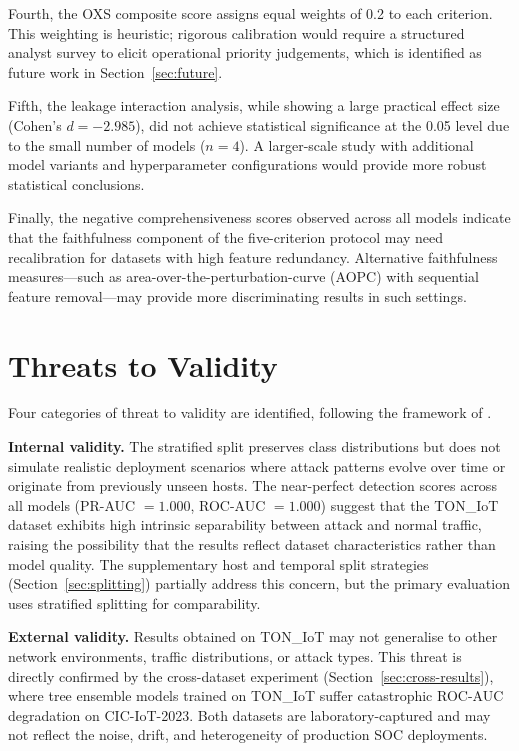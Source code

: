 \documentclass[12pt,a4paper]{report}
\begin{document}
Fourth, the OXS composite score assigns equal weights of 0.2 to each criterion. This weighting is heuristic; rigorous calibration would require a structured analyst survey to elicit operational priority judgements, which is identified as future work in Section~\ref{sec:future}.

Fifth, the leakage interaction analysis, while showing a large practical effect size (Cohen's $d = -2.985$), did not achieve statistical significance at the 0.05 level due to the small number of models ($n = 4$). A larger-scale study with additional model variants and hyperparameter configurations would provide more robust statistical conclusions.

Finally, the negative comprehensiveness scores observed across all models indicate that the faithfulness component of the five-criterion protocol may need recalibration for datasets with high feature redundancy. Alternative faithfulness measures---such as area-over-the-perturbation-curve (AOPC) with sequential feature removal---may provide more discriminating results in such settings.

\section{Threats to Validity}
\label{sec:threats}

Four categories of threat to validity are identified, following the framework of \citet{deyoung2020}.

\textbf{Internal validity.} The stratified split preserves class distributions but does not simulate realistic deployment scenarios where attack patterns evolve over time or originate from previously unseen hosts. The near-perfect detection scores across all models (PR-AUC $= 1.000$, ROC-AUC $= 1.000$) suggest that the TON\_IoT dataset exhibits high intrinsic separability between attack and normal traffic, raising the possibility that the results reflect dataset characteristics rather than model quality. The supplementary host and temporal split strategies (Section~\ref{sec:splitting}) partially address this concern, but the primary evaluation uses stratified splitting for comparability.

\textbf{External validity.} Results obtained on TON\_IoT may not generalise to other network environments, traffic distributions, or attack types. This threat is directly confirmed by the cross-dataset experiment (Section~\ref{sec:cross-results}), where tree ensemble models trained on TON\_IoT suffer catastrophic ROC-AUC degradation on CIC-IoT-2023. Both datasets are laboratory-captured and may not reflect the noise, drift, and heterogeneity of production SOC deployments.
\end{document}
